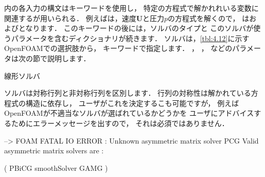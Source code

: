 内の各入力の構文はキーワードを使用し，
特定の方程式で解かれれいる変数に関連するが用いられる．
例えばは，速度$\bm{U}$と圧力$p$の方程式を解くので，
はおよびとなります．
このキーワードの後には，ソルバのタイプと
このソルバが使うパラメータを含むディクショナリが続きます．
ソルバは，\autoref{tbl:4.12}に示すOpenFOAMでの選択肢から，
%
%
キーワードで指定します．
%
%
，
%
%
，
%
%
などのパラメータは次の節で説明します．


\begin{table}[ht]
 
 \caption{線形ソルバ}
 \label{tbl:4.12}
\end{table}


ソルバは対称行列と非対称行列を区別します．
行列の対称性は解かれている方程式の構造に依存し，
ユーザがこれを決定するこも可能ですが，
例えばOpenFOAMが不適当なソルバが選ばれているかどうかを
ユーザにアドバイスするためにエラーメッセージを出すので，
それは必須ではありません．
\begin{OFverbatim}[terminal]
--> FOAM FATAL IO ERROR : Unknown asymmetric matrix solver PCG
Valid asymmetric matrix solvers are :

(
PBiCG
smoothSolver
GAMG
)
\end{OFverbatim}

